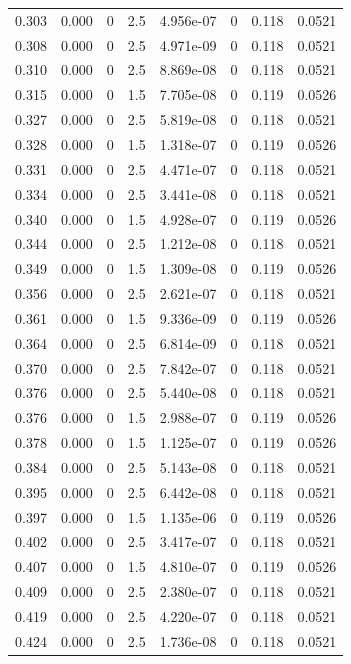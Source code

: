 \documentclass[preview]{standalone}
\begin{document}
{{{\begin{tabular}{L{1.2cm}C{1.2cm} C{0.3cm}C{0.5cm} C{1.4cm}C{1.4cm} C{1.4cm}C{1.4cm}}
  0.303  &  0.000  & 0     & 2.5 &  4.956e-07  & 0  & 0.118 &  0.0521   \\ 
  0.308  &  0.000  & 0     & 2.5 &  4.971e-09  & 0  & 0.118 &  0.0521   \\ 
  0.310  &  0.000  & 0     & 2.5 &  8.869e-08  & 0  & 0.118 &  0.0521   \\ 
  0.315  &  0.000  & 0     & 1.5 &  7.705e-08  & 0  & 0.119 &  0.0526   \\ 
  0.327  &  0.000  & 0     & 2.5 &  5.819e-08  & 0  & 0.118 &  0.0521   \\ 
  0.328  &  0.000  & 0     & 1.5 &  1.318e-07  & 0  & 0.119 &  0.0526   \\ 
  0.331  &  0.000  & 0     & 2.5 &  4.471e-07  & 0  & 0.118 &  0.0521   \\ 
  0.334  &  0.000  & 0     & 2.5 &  3.441e-08  & 0  & 0.118 &  0.0521   \\ 
  0.340  &  0.000  & 0     & 1.5 &  4.928e-07  & 0  & 0.119 &  0.0526   \\ 
  0.344  &  0.000  & 0     & 2.5 &  1.212e-08  & 0  & 0.118 &  0.0521   \\ 
  0.349  &  0.000  & 0     & 1.5 &  1.309e-08  & 0  & 0.119 &  0.0526   \\ 
  0.356  &  0.000  & 0     & 2.5 &  2.621e-07  & 0  & 0.118 &  0.0521   \\ 
  0.361  &  0.000  & 0     & 1.5 &  9.336e-09  & 0  & 0.119 &  0.0526   \\ 
  0.364  &  0.000  & 0     & 2.5 &  6.814e-09  & 0  & 0.118 &  0.0521   \\ 
  0.370  &  0.000  & 0     & 2.5 &  7.842e-07  & 0  & 0.118 &  0.0521   \\ 
  0.376  &  0.000  & 0     & 2.5 &  5.440e-08  & 0  & 0.118 &  0.0521   \\ 
  0.376  &  0.000  & 0     & 1.5 &  2.988e-07  & 0  & 0.119 &  0.0526   \\ 
  0.378  &  0.000  & 0     & 1.5 &  1.125e-07  & 0  & 0.119 &  0.0526   \\ 
  0.384  &  0.000  & 0     & 2.5 &  5.143e-08  & 0  & 0.118 &  0.0521   \\ 
  0.395  &  0.000  & 0     & 2.5 &  6.442e-08  & 0  & 0.118 &  0.0521   \\ 
  0.397  &  0.000  & 0     & 1.5 &  1.135e-06  & 0  & 0.119 &  0.0526   \\ 
  0.402  &  0.000  & 0     & 2.5 &  3.417e-07  & 0  & 0.118 &  0.0521   \\ 
  0.407  &  0.000  & 0     & 1.5 &  4.810e-07  & 0  & 0.119 &  0.0526   \\ 
  0.409  &  0.000  & 0     & 2.5 &  2.380e-07  & 0  & 0.118 &  0.0521   \\ 
  0.419  &  0.000  & 0     & 2.5 &  4.220e-07  & 0  & 0.118 &  0.0521   \\ 
  0.424  &  0.000  & 0     & 2.5 &  1.736e-08  & 0  & 0.118 &  0.0521   \\ 
\hline 
\end{tabular} 

}}}
\end{document}

